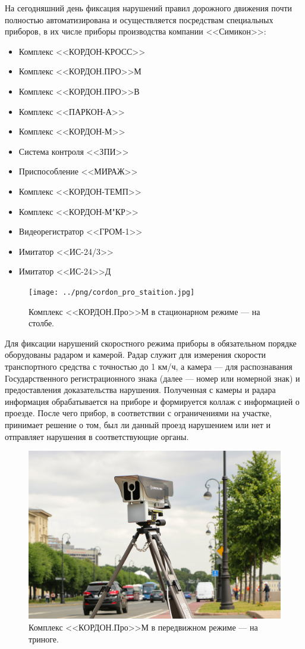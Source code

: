 \documentclass[specification,annotation,times]{itmo-student-thesis}
\begin{document}
На сегодняшний день фиксация нарушений правил дорожного движения почти полностью автоматизирована и осуществляется посредствам специальных приборов, в их числе приборы производства компании <<Симикон>>:
{\begin{itemize}
	\item Комплекс <<КОРДОН-КРОСС>>
	\item Комплекс <<КОРДОН.ПРО>>М
	\item Комплекс <<КОРДОН.ПРО>>В
	\item Комплекс <<ПАРКОН-А>>
	\item Комплекс <<КОРДОН-М>>
	\item Система контроля <<ЗПИ>>
	\item Приспособление <<МИРАЖ>>
	\item Комплекс <<КОРДОН-ТЕМП>>
	\item Комплекс <<КОРДОН-М"КР>>
	\item Видеорегистратор <<ГРОМ-1>>
	\item Имитатор <<ИС-24/3>>
	\item Имитатор <<ИС-24>>Д
\end{itemize}}

\begin{figure}[!ht]
	\caption{Комплекс <<КОРДОН.Про>>М в стационарном режиме --- на столбе.}\label{img:cordon-state}
	\texttt{[image: ../png/cordon\_pro\_staition.jpg]}
	\centering
\end{figure}

Для фиксации нарушений скоростного режима приборы в обязательном порядке оборудованы радаром и камерой. Радар служит для измерения скорости транспортного средства с точностью до 1 км/ч, а камера --- для распознавания Государственного регистрационного знака (далее --- номер или номерной знак) и предоставления доказательства нарушения. Полученная с камеры и радара информация обрабатывается на приборе и формируется коллаж с информацией о проезде. После чего прибор, в соответствии с ограничениями на участке, принимает решение о том, был ли данный проезд нарушением или нет и отправляет нарушения в соответствующие органы.

\begin{figure}[!ht]
	\caption{Комплекс <<КОРДОН.Про>>М в передвижном режиме --- на триноге.}\label{img:cordon-move}
	\includegraphics[width=0.85\linewidth]{../png/cordon_pro_2.jpg}
	\centering
\end{figure}
\end{document}
